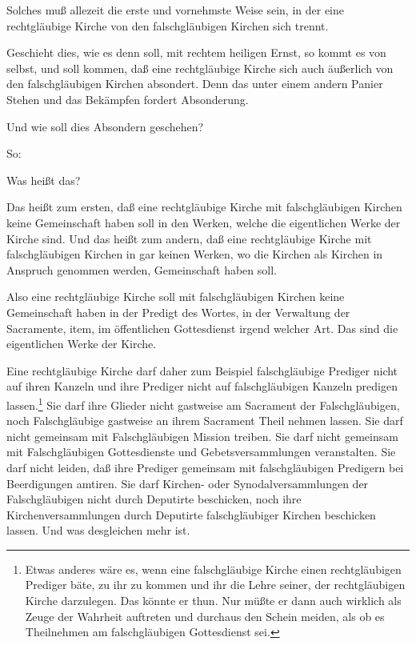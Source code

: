 Solches muß allezeit die erste und vornehmste Weise sein, in der eine rechtgläubige Kirche von den falschgläubigen Kirchen sich trennt.

Geschieht dies, wie es denn soll, mit rechtem heiligen Ernst, so kommt es von selbst, und soll kommen, daß eine rechtgläubige Kirche sich auch äußerlich von den falschgläubigen Kirchen absondert. Denn das unter einem andern Panier Stehen und das Bekämpfen fordert Absonderung.

Und wie soll dies Absondern geschehen?

So:


Was heißt das?

Das heißt zum ersten, daß eine rechtgläubige Kirche mit falschgläubigen Kirchen keine Gemeinschaft haben soll in den Werken, welche die eigentlichen Werke der Kirche sind. Und das heißt zum andern, daß eine rechtgläubige Kirche mit falschgläubigen Kirchen in gar keinen Werken, wo die Kirchen als Kirchen in Anspruch genommen werden, Gemeinschaft haben soll.

Also eine rechtgläubige Kirche soll mit falschgläubigen Kirchen keine Gemeinschaft haben in der Predigt des Wortes, in der Verwaltung der Sacramente, item, im öffentlichen Gottesdienst irgend welcher Art. Das sind die eigentlichen Werke der Kirche.

Eine rechtgläubige Kirche darf daher zum Beispiel falschgläubige Prediger nicht auf ihren Kanzeln und ihre Prediger nicht auf falschgläubigen Kanzeln predigen lassen.\footnote{Etwas anderes wäre es, wenn eine falschgläubige Kirche einen rechtgläubigen Prediger bäte, zu ihr zu kommen und ihr die Lehre seiner, der rechtgläubigen Kirche darzulegen. Das könnte er thun. Nur müßte er dann auch wirklich als Zeuge der Wahrheit auftreten und durchaus den Schein meiden, als ob es Theilnehmen am falschgläubigen Gottesdienst sei.} Sie darf ihre Glieder nicht gastweise am Sacrament der Falschgläubigen, noch Falschgläubige gastweise an ihrem Sacrament Theil nehmen lassen. Sie darf nicht gemeinsam mit Falschgläubigen Mission treiben. Sie darf nicht gemeinsam mit Falschgläubigen Gottesdienste und Gebetsversammlungen veranstalten. Sie darf nicht leiden, daß ihre Prediger gemeinsam mit falschgläubigen Predigern bei Beerdigungen amtiren. Sie darf Kirchen- oder Synodalversammlungen der Falschgläubigen nicht durch Deputirte beschicken, noch ihre Kirchenversammlungen durch Deputirte falschgläubiger Kirchen beschicken lassen. Und was desgleichen mehr ist.

